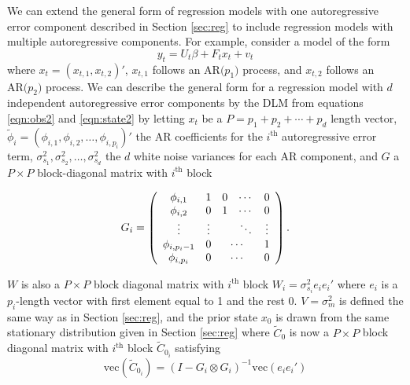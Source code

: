 \documentclass{article}
\begin{document}
We can extend the general form of regression models with one autoregressive error component described in Section \ref{sec:reg} to include regression models with multiple autoregressive components. For example, consider a model of the form \[y_t = U_t\beta + F_tx_t + v_t\] where $x_t = (x_{t,1},x_{t,2})'$, $x_{t,1}$ follows an $\mbox{AR(}p_1\mbox{)}$ process, and $x_{t,2}$ follows an $\mbox{AR(}p_2\mbox{)}$ process. We can describe the general form for a regression model with $d$ independent autoregressive error components by the DLM from equations \eqref{eqn:obs2} and \eqref{eqn:state2} by letting $x_t$ be a $P = p_1 + p_2 + \cdots + p_d$ length vector, $\tilde{\phi}_i = (\phi_{i,1},\phi_{i,2},\ldots,\phi_{i,p_i})'$ the AR coefficients for the $i^{\mbox{th}}$ autoregressive error term, $\sigma^2_{s_1}, \sigma^2_{s_2}, \ldots, \sigma^2_{s_d}$ the $d$ white noise variances for each AR component, and $G$ a $P \times P$ block-diagonal matrix with $i^{\mbox{th}}$ block

\[G_i = \left(
\begin{array}{ccccc}
\phi_{i,1} & 1 & 0 & \cdots & 0 \\
\phi_{i,2} & 0 & 1 & \cdots & 0 \\
\vdots & \vdots & & \ddots & \vdots \\
\phi_{i,p_i-1} & 0 & \multicolumn{2}{c}{\cdots} & 1 \\
\phi_{i,p_i} & 0 & \multicolumn{2}{c}{\cdots} & 0
\end{array}
\right).\]

\noindent $W$ is also a $P\times P$ block diagonal matrix with $i^{\mbox{th}}$ block $W_i = \sigma^2_{s_i}e_ie_i'$ where $e_i$ is a $p_i$-length vector with first element equal to 1 and the rest 0. $V = \sigma^2_m$ is defined the same way as in Section  \ref{sec:reg}, and the prior state $x_0$ is drawn from the same stationary distribution given in Section \ref{sec:reg} where $\tilde{C}_0$ is now a $P\times P$ block diagonal matrix with $i^{\mbox{th}}$ block $\tilde{C}_{0_i}$ satisfying \[\mbox{vec}(\tilde{C}_{0_i}) = (I - G_i \otimes G_i)^{-1}\mbox{vec}(e_ie_i')\]
\end{document}
